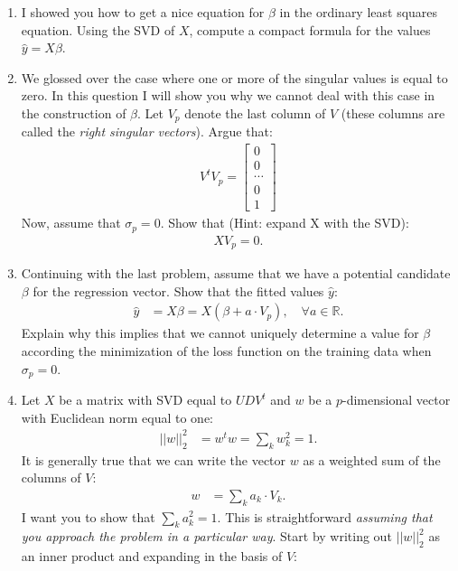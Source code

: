 \documentclass[12pt,hidelinks]{article}
\numberwithin{equation}{section}
\begin{document}
\begin{enumerate}
\item I showed you how to get a nice equation for $\beta$ in the ordinary
least squares equation. Using the SVD of $X$, compute a compact formula for
the values $\widehat{y} = X \beta$.
\item We glossed over the case where one or more of the singular values is equal
to zero. In this question I will show you why we cannot deal with this case
in the construction of $\beta$. Let $V_p$ denote the last column of $V$ (these
columns are called the \textit{right singular vectors}). Argue that:
\begin{align}
V^t V_p = \begin{bmatrix} 0 \\ 0 \\ \cdots \\ 0 \\ 1 \end{bmatrix}
\end{align}
Now, assume that $\sigma_p = 0$. Show that (Hint: expand X with the SVD):
\begin{align}
XV_p = 0.
\end{align}
\item Continuing with the last problem, assume that we have a potential
candidate $\beta$ for the regression vector. Show that the fitted values
$\widehat{y}$:
\begin{align}
\widehat{y} &= X \beta = X (\beta + a \cdot V_p), \quad \forall a \in \mathbb{R}.
\end{align}
Explain why this implies that we cannot uniquely determine a value for $\beta$
according the minimization of the loss function on the training data when
$\sigma_p = 0$.
\item Let $X$ be a matrix with SVD equal to $UDV^t$ and $w$ be a
$p$-dimensional vector with Euclidean norm equal to one:
\begin{align}
|| w ||_2^2 &= w^t w = \sum_k w_k^2 = 1.
\end{align}
It is generally true that we can write the vector $w$ as a weighted sum of
the columns of $V$:
\begin{align}
w &= \sum_k a_k \cdot V_k.
\end{align}
I want you to show that $\sum_k a_k^2 = 1$. This is straightforward
\textit{assuming that you approach the problem in a particular way}. Start
by writing out $|| w ||_2^2$ as an inner product and expanding in the basis
of $V$:
\begin{align}

\end{align}
\end{enumerate}
\end{document}
